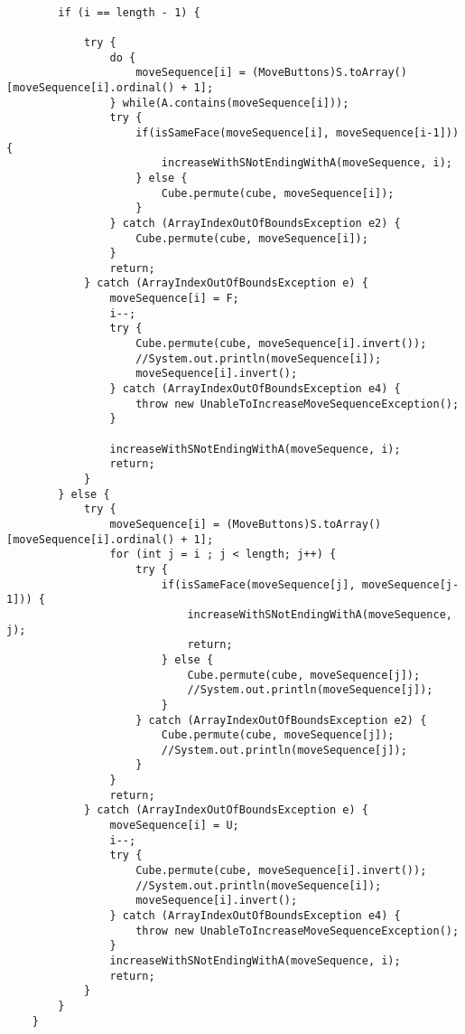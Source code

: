 \begin{verbatim}

		if (i == length - 1) {

			try {
				do {
					moveSequence[i] = (MoveButtons)S.toArray()[moveSequence[i].ordinal() + 1];
				} while(A.contains(moveSequence[i]));
				try {
					if(isSameFace(moveSequence[i], moveSequence[i-1])) {
						increaseWithSNotEndingWithA(moveSequence, i);
					} else {
						Cube.permute(cube, moveSequence[i]);
					}
				} catch (ArrayIndexOutOfBoundsException e2) {
					Cube.permute(cube, moveSequence[i]);
				}
				return;
			} catch (ArrayIndexOutOfBoundsException e) {
				moveSequence[i] = F;
				i--;
				try {
					Cube.permute(cube, moveSequence[i].invert());
					//System.out.println(moveSequence[i]);
					moveSequence[i].invert();
				} catch (ArrayIndexOutOfBoundsException e4) {
					throw new UnableToIncreaseMoveSequenceException();
				}

				increaseWithSNotEndingWithA(moveSequence, i);
				return;
			}
		} else {
			try {
				moveSequence[i] = (MoveButtons)S.toArray()[moveSequence[i].ordinal() + 1];
				for (int j = i ; j < length; j++) {
					try {
						if(isSameFace(moveSequence[j], moveSequence[j-1])) {
							increaseWithSNotEndingWithA(moveSequence, j);
							return;
						} else {
							Cube.permute(cube, moveSequence[j]);
							//System.out.println(moveSequence[j]);
						}
					} catch (ArrayIndexOutOfBoundsException e2) {
						Cube.permute(cube, moveSequence[j]);
						//System.out.println(moveSequence[j]);
					}
				}
				return; 
			} catch (ArrayIndexOutOfBoundsException e) {
				moveSequence[i] = U;
				i--;
				try {
					Cube.permute(cube, moveSequence[i].invert());
					//System.out.println(moveSequence[i]);
					moveSequence[i].invert();
				} catch (ArrayIndexOutOfBoundsException e4) {
					throw new UnableToIncreaseMoveSequenceException();
				}
				increaseWithSNotEndingWithA(moveSequence, i);
				return;
			}
		}
	}
	
\end{verbatim}